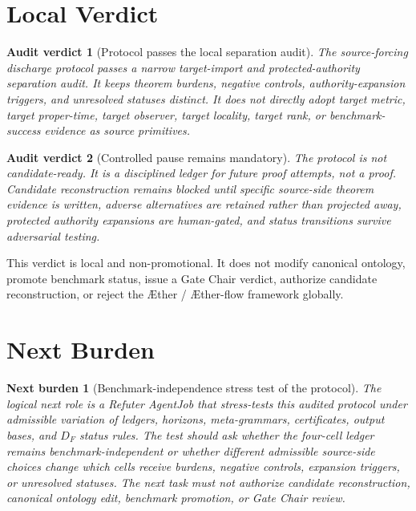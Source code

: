 \documentclass[11pt]{article}
\newcommand{\Aether}{\AE{}ther}
\newcommand{\Aflow}{\AE{}ther-flow}
\newcommand{\TheoryProgram}{\Aether{} / \Aflow{} framework}
\newtheorem{auditverdict}{Audit verdict}
\newtheorem{nextburden}{Next burden}
\begin{document}
\section{Local Verdict}

\begin{auditverdict}[Protocol passes the local separation audit]
The source-forcing discharge protocol passes a narrow target-import and
protected-authority separation audit. It keeps theorem burdens, negative
controls, authority-expansion triggers, and unresolved statuses distinct.
It does not directly adopt target metric, target proper-time, target
observer, target locality, target rank, or benchmark-success evidence as
source primitives.
\end{auditverdict}

\begin{auditverdict}[Controlled pause remains mandatory]
The protocol is not candidate-ready. It is a disciplined ledger for future
proof attempts, not a proof. Candidate reconstruction remains blocked until
specific source-side theorem evidence is written, adverse alternatives are
retained rather than projected away, protected authority expansions are
human-gated, and status transitions survive adversarial testing.
\end{auditverdict}

This verdict is local and non-promotional. It does not modify canonical
ontology, promote benchmark status, issue a Gate Chair verdict, authorize
candidate reconstruction, or reject the \TheoryProgram{} globally.

\section{Next Burden}

\begin{nextburden}[Benchmark-independence stress test of the protocol]
The logical next role is a Refuter AgentJob that stress-tests this audited
protocol under admissible variation of ledgers, horizons, meta-grammars,
certificates, output bases, and \(D_F\) status rules. The test should ask
whether the four-cell ledger remains benchmark-independent or whether
different admissible source-side choices change which cells receive burdens,
negative controls, expansion triggers, or unresolved statuses. The next task
must not authorize candidate reconstruction, canonical ontology edit,
benchmark promotion, or Gate Chair review.
\end{nextburden}
\end{document}
